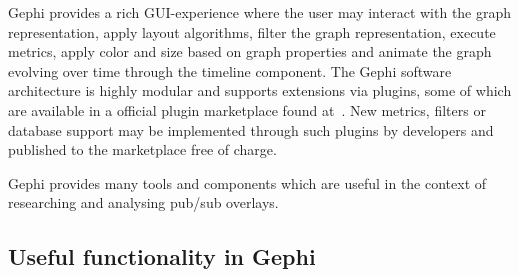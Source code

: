 Gephi provides a rich GUI-experience where the user may interact with the
graph representation, apply layout algorithms, filter the graph
representation, execute metrics, apply color and size based on graph
properties and animate the graph evolving over time through the timeline
component. The Gephi software architecture is highly modular and
supports extensions via plugins, some of which are available in a
official plugin marketplace found at~\cite{gephimarketplace}. New
metrics, filters or database support may be implemented through such
plugins by developers and published to the marketplace free of charge.

Gephi provides many tools and components which are useful in the context
of researching and analysing pub/sub overlays.

\subsection{Useful functionality in Gephi}

